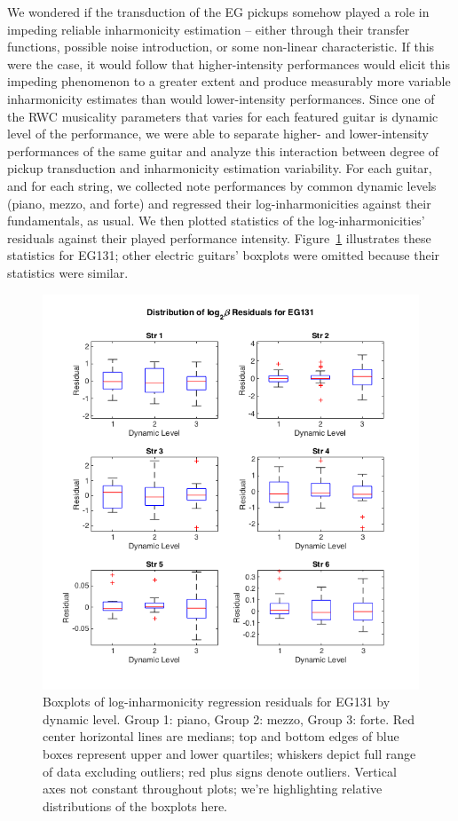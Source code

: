 \documentclass[12pt]{cmuthesis}
\begin{document}
We wondered if the transduction of the EG pickups somehow played a role in impeding reliable inharmonicity estimation -- either through their transfer functions, possible noise introduction, or some non-linear characteristic. If this were the case, it would follow that higher-intensity performances would elicit this impeding phenomenon to a greater extent and produce measurably more variable inharmonicity estimates than would lower-intensity performances. Since one of the RWC musicality parameters that varies for each featured guitar is dynamic level of the performance, we were able to separate higher- and lower-intensity performances of the same guitar and analyze this interaction between degree of pickup transduction and inharmonicity estimation variability. For each guitar, and for each string, we collected note performances by common dynamic levels (piano, mezzo, and forte) and regressed their log-inharmonicities against their fundamentals, as usual. We then plotted statistics of the log-inharmonicities' residuals against their played performance intensity. Figure~\ref{fig:eg1-string-dyn} illustrates these statistics for EG131; other electric guitars' boxplots were omitted because their statistics were similar.
\begin{figure}[!htbp] 
\centering
\includegraphics[scale=0.75]{eg1-string-dyn}
\caption{Boxplots of log-inharmonicity regression residuals for EG131 by dynamic level. Group 1: piano, Group 2: mezzo, Group 3: forte. Red center horizontal lines are medians; top and bottom edges of blue boxes represent upper and lower quartiles; whiskers depict full range of data excluding outliers; red plus signs denote outliers. Vertical axes not constant throughout plots; we're highlighting relative distributions of the boxplots here.}
\label{fig:eg1-string-dyn}
\end{figure} 
\end{document}
